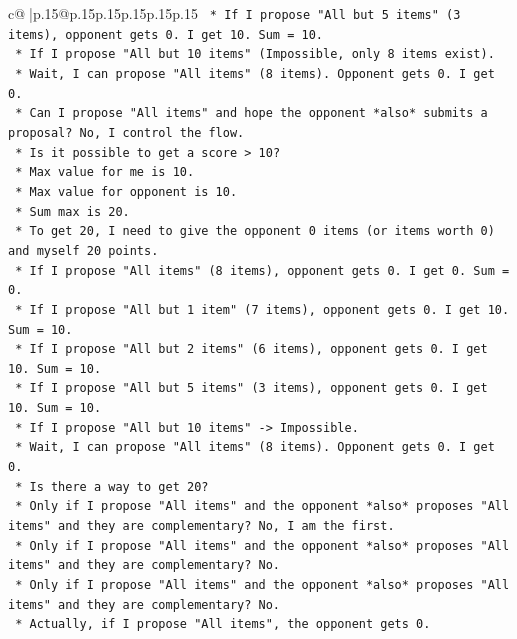 \documentclass{article}
\begin{document}
{\begin{supertabular}{c@{$\;$}|p{.15\linewidth}@{}p{.15\linewidth}p{.15\linewidth}p{.15\linewidth}p{.15\linewidth}p{.15\linewidth}}
{{{\texttt{        *   If I propose "All but 5 items" (3 items), opponent gets 0. I get 10. Sum = 10.} \\
\texttt{        *   If I propose "All but 10 items" (Impossible, only 8 items exist).} \\
\texttt{        *   Wait, I can propose "All items" (8 items). Opponent gets 0. I get 0.} \\
\texttt{        *   Can I propose "All items" and hope the opponent *also* submits a proposal? No, I control the flow.} \\
\texttt{        *   Is it possible to get a score > 10?} \\
\texttt{            *   Max value for me is 10.} \\
\texttt{            *   Max value for opponent is 10.} \\
\texttt{            *   Sum max is 20.} \\
\texttt{            *   To get 20, I need to give the opponent 0 items (or items worth 0) and myself 20 points.} \\
\texttt{            *   If I propose "All items" (8 items), opponent gets 0. I get 0. Sum = 0.} \\
\texttt{            *   If I propose "All but 1 item" (7 items), opponent gets 0. I get 10. Sum = 10.} \\
\texttt{            *   If I propose "All but 2 items" (6 items), opponent gets 0. I get 10. Sum = 10.} \\
\texttt{            *   If I propose "All but 5 items" (3 items), opponent gets 0. I get 10. Sum = 10.} \\
\texttt{            *   If I propose "All but 10 items" {-}> Impossible.} \\
\texttt{            *   Wait, I can propose "All items" (8 items). Opponent gets 0. I get 0.} \\
\texttt{            *   Is there a way to get 20?} \\
\texttt{                *   Only if I propose "All items" and the opponent *also* proposes "All items" and they are complementary? No, I am the first.} \\
\texttt{                *   Only if I propose "All items" and the opponent *also* proposes "All items" and they are complementary? No.} \\
\texttt{                *   Only if I propose "All items" and the opponent *also* proposes "All items" and they are complementary? No.} \\
\texttt{                *   Actually, if I propose "All items", the opponent gets 0.} \\
}}}
\end{supertabular}}
\end{document}
